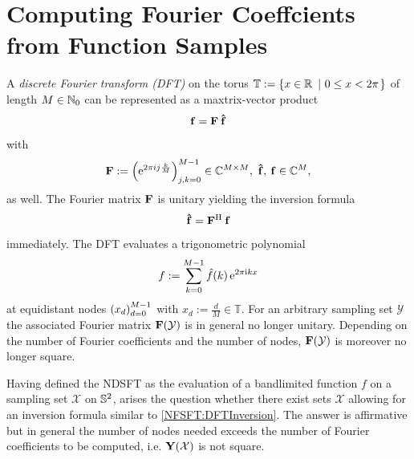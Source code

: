 
\section{Computing Fourier Coeffcients from Function Samples}
A \emph{discrete Fourier transform (DFT)} on the torus $\mathbb{T} := \left\{x \in \mathbb{R}\ \left|\ 0 \le x < 2\pi\right.\right\rbrace$ of length $M \in \mathbb{N}_{0}$ can be represented 
as a maxtrix-vector product
$$
  \mathbf{f} = \mathbf{F} \: \mathbf{\hat{f}}
$$
with
$$
 \mathbf{F} := \left(\mbox{\rm{e}}^{2 \pi i j \frac{k}{M}}\right)_{j,k = 0}^{M-1} \in \mathbb{C}^{M \times M},\ \mathbf{\hat{f}},\:\mathbf{f} \in \mathbb{C}^{M},
$$
as well. The Fourier matrix $\mathbf{F}$ is unitary yielding the inversion formula
\begin{equation}
  \label{NFSFT:DFTInversion}
  \mathbf{\hat{f}} = \mathbf{F}^{\text{\rm{H}}} \: \mathbf{f}
\end{equation}
immediately. The DFT evaluates a trigonometric polynomial 
$$
  f := \sum_{k=0}^{M-1} \hat{f}{\hspace{-0.4ex}}\left(k\right) \mbox{\rm{e}}^{2 \pi \mbox{\scriptsize\rm{i}} k x}
$$
at equidistant nodes $\left(x_{d}\right)_{d=0}^{M-1}$ with $x_{d} := \frac{d}{M} \in \mathbb{T}$. 
For an arbitrary sampling set $\mathcal{Y}$ the associated Fourier matrix $\mathbf{F}{\hspace{-0.4ex}}\left(\mathcal{Y}\right)$ is in general no longer unitary. 
Depending on the number of Fourier coefficients and the number of nodes,
$\mathbf{F}{\hspace{-0.4ex}}\left(\mathcal{Y}\right)$ is moreover no longer square.

Having defined the NDSFT as the evaluation of a bandlimited function $f$ on a sampling set $\mathcal{X}$ on $\mathbb{S}^2$, arises the question 
whether there exist sets $\mathcal{X}$ allowing for an inversion formula similar to \eqref{NFSFT:DFTInversion}.
The answer is affirmative but in general the number of nodes needed exceeds the number of Fourier coefficients to be computed, 
i.e. $\mathbf{Y}{\hspace{-0.4ex}}\left(\mathcal{X}\right)$ is not square.

